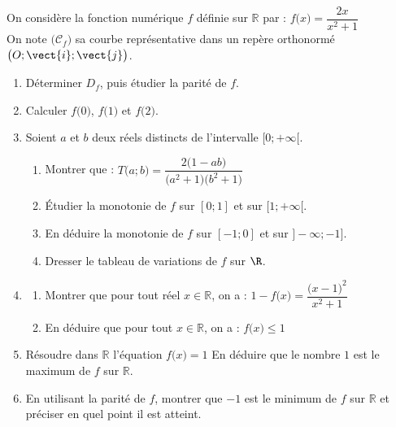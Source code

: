 \begin{Exercice}[][15 min]
On considère la fonction numérique $f$ définie sur $\mathbb{R}$ par : \quad
$f\big(x\big) = \dfrac{2x}{x^2 + 1}$
\vspace{0.2cm} \\
On note $\big(\mathcal{C}_f\big)$ sa courbe représentative dans un repère orthonormé $\big(O; \vect{i}; \vect{j}\big)$.

\begin{enumerate}
    \item Déterminer $D_f$, puis étudier la parité de $f$.
    \item Calculer $f\big(0\big)$, $f\big(1\big)$ et $f\big(2\big)$.

    \item Soient $a$ et $b$ deux réels distincts de l'intervalle $[0; +\infty[$.
    \begin{enumerate}
        \item Montrer que :
        $T\big(a; b\big) = \dfrac{2\big(1 - ab\big)}{\big(a^2 + 1\big)\big(b^2 + 1\big)}$
        \item Étudier la monotonie de $f$ sur $[0; 1]$ et sur $[1; +\infty[$.
        \item En déduire la monotonie de $f$ sur $[-1; 0]$ et sur $]-\infty; -1]$.
        \item Dresser le tableau de variations de $f$ sur $\R$.
    \end{enumerate}
    

    \item 
    \begin{enumerate}
        \item Montrer que pour tout réel $x \in \mathbb{R}$, on a : $1 - f\big(x\big) = \dfrac{\big(x - 1\big)^2}{x^2 + 1}$
        \item En déduire que pour tout $x \in \mathbb{R}$, on a : $f\big(x\big) \leqslant 1$
    \end{enumerate}
    \item Résoudre dans $\mathbb{R}$ l'équation $f\big(x\big) = 1$
          En déduire que le nombre $1$ est le maximum de $f$ sur $\mathbb{R}$.
    \item En utilisant la parité de $f$, montrer que $-1$ est le minimum de $f$ sur $\mathbb{R}$ et préciser en quel point il est atteint.
\end{enumerate}
\end{Exercice}
